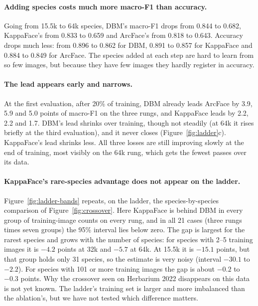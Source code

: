 \documentclass[11pt]{article}
\begin{document}
\paragraph{Adding species costs much more macro-F1 than accuracy.} Going from 15.5k to
64k species, DBM's macro-F1 drops from 0.844 to 0.682, KappaFace's from 0.833 to 0.659
and ArcFace's from 0.818 to 0.643. Accuracy drops much less: from 0.896 to 0.862 for DBM,
0.891 to 0.857 for KappaFace and 0.884 to 0.849 for ArcFace. The species added at each
step are hard to learn from so few images, but because they have few images they hardly
register in accuracy.

\paragraph{The lead appears early and narrows.} At the first evaluation, after 20\% of
training, DBM already leads ArcFace by 3.9, 5.9 and 5.0 points of macro-F1 on the three
rungs, and KappaFace leads by 2.2, 2.2 and 1.7. DBM's lead shrinks over training, though
not steadily (at 64k it rises briefly at the third evaluation), and it never closes
(Figure~\ref{fig:ladder}c). KappaFace's lead shrinks less. All three losses are still
improving slowly at the end of training, most visibly on the 64k rung, which gets the
fewest passes over its data.

\paragraph{KappaFace's rare-species advantage does not appear on the ladder.}
Figure~\ref{fig:ladder-bands} repeats, on the ladder, the species-by-species comparison of
Figure~\ref{fig:crossover}. Here KappaFace is behind DBM in every group of training-image
counts on every rung, and in all 21 cases (three rungs times seven groups) the 95\%
interval lies below zero. The gap is largest for the rarest species and grows with the
number of species: for species with 2--5 training images it is $-4.2$ points at 32k and
$-5.7$ at 64k. At 15.5k it is $-15.1$ points, but that group holds only 31 species, so the
estimate is very noisy (interval $-30.1$ to $-2.2$). For species with 101 or more training
images the gap is about $-0.2$ to $-0.3$ points. Why the crossover seen on Herbarium 2022
disappears on this data is not yet known. The ladder's training set is larger and more
imbalanced than the ablation's, but we have not tested which difference matters.
\end{document}
